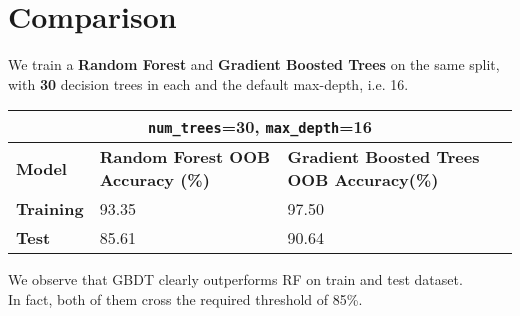 \section{Comparison}

We train a \textbf{Random Forest} and \textbf{Gradient Boosted Trees} on the same split, with \textbf{30} decision trees in each and 
the default max-depth, i.e. 16.\\


\begin{tabular}{ |p{3cm}||p{3cm}||p{5cm}|}
\hline
\multicolumn{3}{|c|}{\texttt{num\_trees}=30, \texttt{max\_depth}=16}\\
\hline
\textbf{Model}& \textbf{Random Forest OOB Accuracy (\%)}&\textbf{Gradient Boosted Trees OOB Accuracy(\%)}\\
\hline
\textbf{{Training}} &  93.35 & 97.50 \\
\textbf{{Test}} &  85.61 & 90.64 \\
\hline
\end{tabular}\newline

We observe that GBDT clearly outperforms RF on train and test dataset.\\
In fact, both of them cross the required threshold of 85\%.